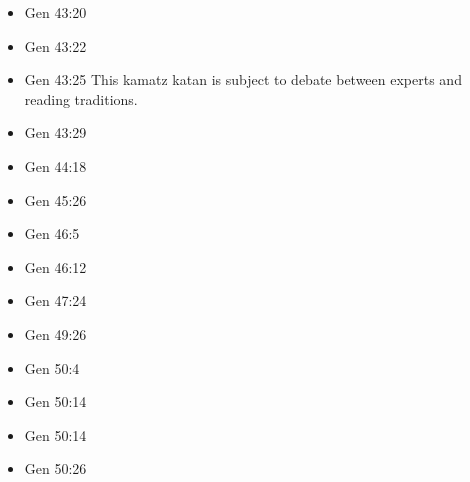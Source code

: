 \documentclass[14pt]{article}
\begin{document}
\begin{multicols}{2}
\begin{itemize}
\item Gen 43:20

\item Gen 43:22

\item Gen 43:25 This kamatz katan is subject to debate between experts and reading traditions.

\item Gen 43:29

\item Gen 44:18

\item Gen 45:26

\item Gen 46:5

\item Gen 46:12

\item Gen 47:24

\item Gen 49:26

\item Gen 50:4

\item Gen 50:14

\item Gen 50:14

\item Gen 50:26
\end{itemize}\end{multicols}
\end{document}
